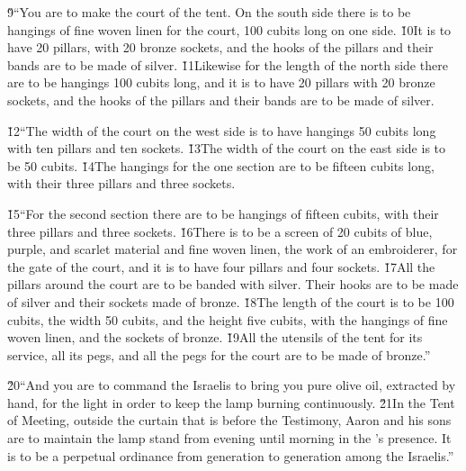 \v{9}``You are to make the court of the tent. On the south side there is to be hangings of fine woven linen for the court, 100 cubits long on one side. \v{10}It is to have 20 pillars, with 20 bronze sockets, and the hooks of the pillars and their bands are to be made of silver. \v{11}Likewise for the length of the north side there are to be hangings 100 cubits long, and it is to have 20 pillars with 20 bronze sockets, and the hooks of the pillars and their bands are to be made of silver.

\v{12}``The width of the court on the west side is to have hangings 50 cubits long with ten pillars and ten sockets. \v{13}The width of the court on the east side is to be 50 cubits. \v{14}The hangings for the one section are to be fifteen cubits long, with their three pillars and three sockets.

\v{15}``For the second section there are to be hangings of fifteen cubits, with their three pillars and three sockets. \v{16}There is to be a screen of 20 cubits of blue, purple, and scarlet material and fine woven linen, the work of an embroiderer, for the gate of the court, and it is to have four pillars and four sockets. \v{17}All the pillars around the court are to be banded with silver. Their hooks are to be made of silver and their sockets made of bronze. \v{18}The length of the court is to be 100 cubits, the width 50 cubits, and the height five cubits, with the hangings of fine woven linen, and the sockets of bronze. \v{19}All the utensils of the tent for its service, all its pegs, and all the pegs for the court are to be made of bronze.''

\v{20}``And you are to command the Israelis to bring you pure olive oil, extracted by hand, for the light in order to keep the lamp burning continuously. \v{21}In the Tent of Meeting, outside the curtain that is before the Testimony, Aaron and his sons are to maintain the lamp stand from evening until morning in the 's presence. It is to be a perpetual ordinance from generation to generation among the Israelis.''

